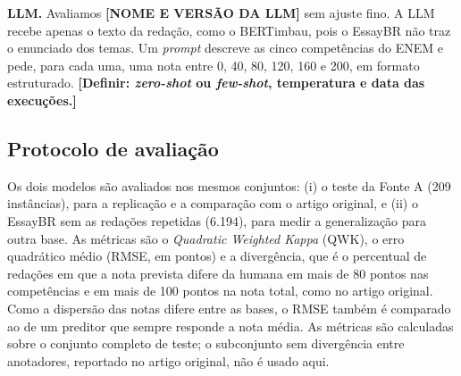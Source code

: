\textbf{LLM.} Avaliamos \textbf{[NOME E VERSÃO DA LLM]} sem ajuste fino. A LLM recebe apenas o texto da redação, como o BERTimbau, pois o EssayBR não traz o enunciado dos temas. Um \textit{prompt} descreve as cinco competências do ENEM e pede, para cada uma, uma nota entre 0, 40, 80, 120, 160 e 200, em formato estruturado. \textbf{[Definir: \textit{zero-shot} ou \textit{few-shot}, temperatura e data das execuções.]}

\subsection{Protocolo de avaliação}

Os dois modelos são avaliados nos mesmos conjuntos: (i) o teste da Fonte A (209 instâncias), para a replicação e a comparação com o artigo original, e (ii) o EssayBR sem as redações repetidas (6.194), para medir a generalização para outra base. As métricas são o \textit{Quadratic Weighted Kappa} (QWK), o erro quadrático médio (RMSE, em pontos) e a divergência, que é o percentual de redações em que a nota prevista difere da humana em mais de 80 pontos nas competências e em mais de 100 pontos na nota total, como no artigo original. %
Como a dispersão das notas difere entre as bases, o RMSE também é comparado ao de um preditor que sempre responde a nota média. As métricas são calculadas sobre o conjunto completo de teste; o subconjunto sem divergência entre anotadores, reportado no artigo original, não é usado aqui.
